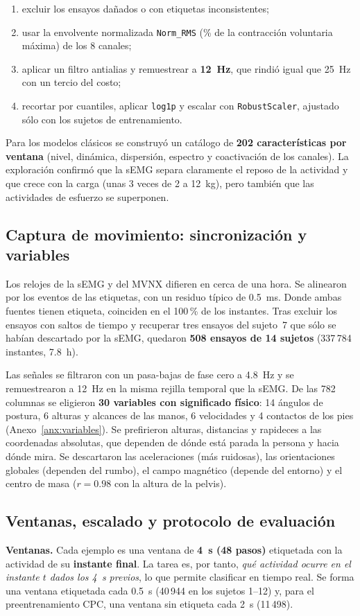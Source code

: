 \documentclass[letterpaper,11pt]{article}
\begin{document}
\begin{enumerate}
  \item excluir los ensayos dañados o con etiquetas inconsistentes;
  \item usar la envolvente normalizada \texttt{Norm\_RMS} (\% de la contracción voluntaria máxima) de los 8 canales;
  \item aplicar un filtro antialias y remuestrear a \textbf{12~Hz}, que rindió igual que 25~Hz con un tercio del costo;
  \item recortar por cuantiles, aplicar \texttt{log1p} y escalar con \texttt{RobustScaler}, ajustado sólo con los sujetos de entrenamiento.
\end{enumerate}

Para los modelos clásicos se construyó un catálogo de \textbf{202 características por ventana} (nivel, dinámica, dispersión, espectro y coactivación de los canales). La exploración confirmó que la sEMG separa claramente el reposo de la actividad y que crece con la carga (unas 3 veces de 2 a 12~kg), pero también que las actividades de esfuerzo se superponen.

\subsection{Captura de movimiento: sincronización y variables}
Los relojes de la sEMG y del MVNX difieren en cerca de una hora. Se alinearon por los eventos de las etiquetas, con un residuo típico de 0.5~ms. Donde ambas fuentes tienen etiqueta, coinciden en el 100\,\% de los instantes. Tras excluir los ensayos con saltos de tiempo y recuperar tres ensayos del sujeto~7 que sólo se habían descartado por la sEMG, quedaron \textbf{508 ensayos de 14 sujetos} (337\,784 instantes, 7.8~h).

Las señales se filtraron con un pasa-bajas de fase cero a 4.8~Hz y se remuestrearon a 12~Hz en la misma rejilla temporal que la sEMG. De las 782 columnas se eligieron \textbf{30 variables con significado físico}: 14 ángulos de postura, 6 alturas y alcances de las manos, 6 velocidades y 4 contactos de los pies (Anexo~\ref{anx:variables}). Se prefirieron alturas, distancias y rapideces a las coordenadas absolutas, que dependen de dónde está parada la persona y hacia dónde mira. Se descartaron las aceleraciones (más ruidosas), las orientaciones globales (dependen del rumbo), el campo magnético (depende del entorno) y el centro de masa ($r = 0.98$ con la altura de la pelvis).

\subsection{Ventanas, escalado y protocolo de evaluación}
\label{sec:protocolo}
\textbf{Ventanas.} Cada ejemplo es una ventana de \textbf{4~s (48 pasos)} etiquetada con la actividad de su \textbf{instante final}. La tarea es, por tanto, \emph{qué actividad ocurre en el instante $t$ dados los 4~s previos}, lo que permite clasificar en tiempo real. Se forma una ventana etiquetada cada 0.5~s (40\,944 en los sujetos 1--12) y, para el preentrenamiento CPC, una ventana sin etiqueta cada 2~s (11\,498).
\end{document}
